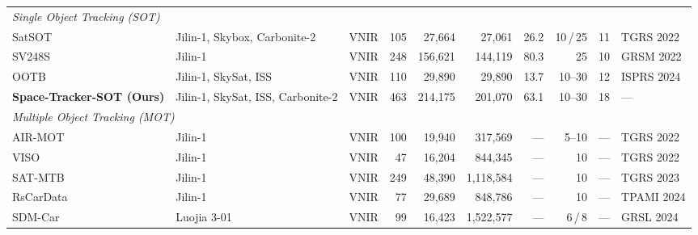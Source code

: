 \begin{table}[H]
{\begin{tabular}{l l l r r r r r r l}
\midrule
\multicolumn{10}{l}{\textit{Single Object Tracking (SOT)}} \\
SatSOT~\cite{satSOT2022}              & Jilin-1, Skybox, Carbonite-2                     & VNIR & 105 &  27{,}664 &      27{,}061 & 26.2 &  10\,/\,25 & 11 & TGRS 2022  \\
SV248S~\cite{Li2022SV248S}            & Jilin-1                      & VNIR & 248 & 156{,}621 &     144{,}119 & 80.3 &  25 & 10 & GRSM 2022  \\
OOTB~\cite{CHEN2024212ootb}           & Jilin-1, SkySat, ISS         & VNIR & 110 &  29{,}890 &      29{,}890 & 13.7 &  10--30 & 12 & ISPRS 2024 \\
\textbf{Space-Tracker-SOT (Ours)}     & Jilin-1, SkySat, ISS, Carbonite-2         & VNIR & 463 & 214{,}175 &     201{,}070 & 63.1 &  10--30 & 18 & --- \\
\midrule
\multicolumn{10}{l}{\textit{Multiple Object Tracking (MOT)}} \\
AIR-MOT~\cite{He2022TGraM}            & Jilin-1                      & VNIR & 100 &  19{,}940 &     317{,}569 & --- & 5--10 & --- & TGRS 2022  \\
VISO~\cite{yin2021viso}               & Jilin-1                      & VNIR &  47 &  16{,}204 &     844{,}345 & --- & 10 & --- & TGRS 2022  \\
SAT-MTB~\cite{Li2023SATMTB}           & Jilin-1                      & VNIR & 249 &  48{,}390 &  1{,}118{,}584 & --- & 10 & --- & TGRS 2023  \\
RsCarData~\cite{Xiao2024HiEUM}        & Jilin-1                      & VNIR &  77 &  29{,}689 &     848{,}786 & --- & 10 & --- & TPAMI 2024 \\
SDM-Car~\cite{Zhang2024SDMCar}        & Luojia 3-01                  & VNIR &  99 &  16{,}423 &  1{,}522{,}577 & --- &  6\,/\,8 & --- & GRSL 2024  \\
\bottomrule
\end{tabular}%
}
\end{table}

